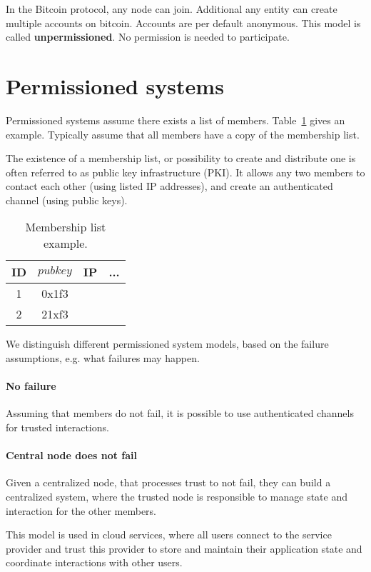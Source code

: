 
\noindent
In the Bitcoin protocol, any node can join. Additional any entity can create multiple accounts on bitcoin. Accounts are per default anonymous.
This model is called \textbf{unpermissioned}. No permission is needed to participate. 

\section{Permissioned systems}
Permissioned systems assume there exists a list of members. 
Table~\ref{tab:members} gives an example. Typically assume that all members have a copy of the membership list. 

The existence of a membership list, or possibility to create and distribute one
is often referred to as public key infrastructure (PKI).
It allows any two members to contact each other (using listed IP addresses), and create an authenticated channel (using public keys).

\begin{table}[h]
	\centering
	\begin{tabular}{| c | c | c | c | }
		\hline
		ID & $pubkey$ & IP & ... \\
		\hline
		1 & 0x1f3 & &\\
		\hline
		2 & 21xf3 & &\\
		\hline
		
	\end{tabular}
	\caption{Membership list example. \label{tab:members}}
\end{table}

We distinguish different permissioned system models, based on the failure assumptions, e.g. what failures may happen.

\paragraph{No failure}
Assuming that members do not fail, it is possible to use authenticated channels for trusted interactions.

\paragraph{Central node does not fail}
Given a centralized node, that processes trust to not fail, they can build a centralized system, where the trusted node is responsible to manage state and interaction for the other members.

This model is used in cloud services, where all users connect to the service provider and trust this provider to store and maintain their application state and coordinate interactions with other users.

